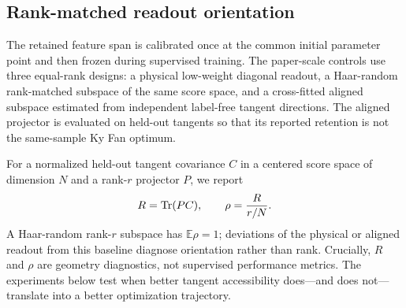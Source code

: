 \subsection{Rank-matched readout orientation}
The retained feature span is calibrated once at the common initial parameter point and then frozen during supervised training. The paper-scale controls use three equal-rank designs: a physical low-weight diagonal readout, a Haar-random rank-matched subspace of the same score space, and a cross-fitted aligned subspace estimated from independent label-free tangent directions. The aligned projector is evaluated on held-out tangents so that its reported retention is not the same-sample Ky Fan optimum.

For a normalized held-out tangent covariance $C$ in a centered score space of dimension $N$ and a rank-$r$ projector $P$, we report
\begin{equation}
 R=\operatorname{Tr}(PC),\qquad \rho=\frac{R}{r/N}.
 \label{eq:retention}
\end{equation}
A Haar-random rank-$r$ subspace has $\mathbb E\rho=1$; deviations of the physical or aligned readout from this baseline diagnose orientation rather than rank. Crucially, $R$ and $\rho$ are geometry diagnostics, not supervised performance metrics. The experiments below test when better tangent accessibility does---and does not---translate into a better optimization trajectory.
